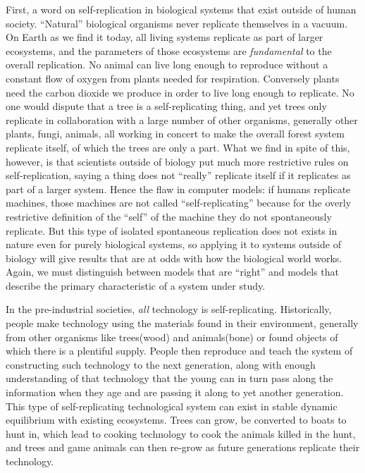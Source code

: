 \documentclass[12pt,a4paper]{amsart}
\numberwithin{equation}{section}
\begin{document}
First, a word on self-replication in biological systems that exist
outside of human society. ``Natural'' biological organisms never
replicate themselves in a vacuum. On Earth as we find it today, all
living systems replicate as part of larger ecosystems, and the
parameters of those ecosystems are \emph{fundamental} to the overall
replication. No animal can live long enough to reproduce without a
constant flow of oxygen from plants needed for respiration. Conversely
plants need the carbon dioxide we produce in order to live long enough
to replicate. No one would dispute that a tree is a self-replicating
thing, and yet trees only replicate in collaboration with a large number
of other organisms, generally other plants, fungi, animals, all working
in concert to make the overall forest system replicate itself, of which
the trees are only a part. What we find in spite of this, however, is
that scientists outside of biology put much more restrictive rules on
self-replication, saying a thing does not ``really'' replicate itself if
it replicates as part of a larger system. Hence the flaw in computer
models: if humans replicate machines, those machines are not called
``self-replicating'' because for the overly restrictive definition of
the ``self'' of the machine they do not spontaneously replicate. But
this type of isolated spontaneous replication does not exists in nature
even for purely biological systems, so applying it to systems outside of
biology will give results that are at odds with how the biological world
works. Again, we must distinguish between models that are ``right'' and
models that describe the primary characteristic of a system under study.

In the pre-industrial societies, \emph{all} technology is
self-replicating. Historically, people make technology using the
materials found in their environment, generally from other organisms
like trees(wood) and animals(bone) or found objects of which there is a
plentiful supply. People then reproduce and teach the system of
constructing such technology to the next generation, along with enough
understanding of that technology that the young can in turn pass along
the information when they age and are passing it along to yet another
generation. This type of self-replicating technological system can exist
in stable dynamic equilibrium with existing ecosystems. Trees can grow,
be converted to boats to hunt in, which lead to cooking technology to
cook the animals killed in the hunt, and trees and game animals can then
re-grow as future generations replicate their technology.
\end{document}

